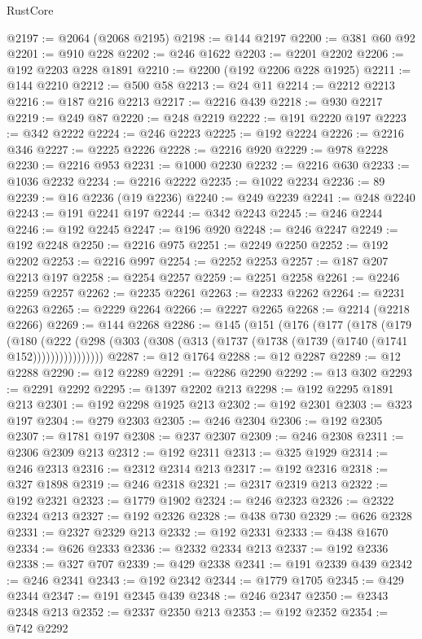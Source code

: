 \begin{lexlean}{RustCore}
\begin{coremodule}
@2197 := @2064 (@2068 @2195)
@2198 := @144 @2197
@2200 := @381 @60 @92
@2201 := @910 @228
@2202 := @246 @1622
@2203 := @2201 @2202
@2206 := @192 @2203 @228 @1891
@2210 := @2200 (@192 @2206 @228 @1925)
@2211 := @144 @2210
@2212 := @500 @58
@2213 := @24 @11
@2214 := @2212 @2213
@2216 := @187 @216 @2213
@2217 := @2216 @439
@2218 := @930 @2217
@2219 := @249 @87
@2220 := @248 @2219
@2222 := @191 @2220 @197
@2223 := @342 @2222
@2224 := @246 @2223
@2225 := @192 @2224
@2226 := @2216 @346
@2227 := @2225 @2226
@2228 := @2216 @920
@2229 := @978 @2228
@2230 := @2216 @953
@2231 := @1000 @2230
@2232 := @2216 @630
@2233 := @1036 @2232
@2234 := @2216 @2222
@2235 := @1022 @2234
@2236 := 89
@2239 := @16 @2236 (@19 @2236)
@2240 := @249 @2239
@2241 := @248 @2240
@2243 := @191 @2241 @197
@2244 := @342 @2243
@2245 := @246 @2244
@2246 := @192 @2245
@2247 := @196 @920
@2248 := @246 @2247
@2249 := @192 @2248
@2250 := @2216 @975
@2251 := @2249 @2250
@2252 := @192 @2202
@2253 := @2216 @997
@2254 := @2252 @2253
@2257 := @187 @207 @2213 @197
@2258 := @2254 @2257
@2259 := @2251 @2258
@2261 := @2246 @2259 @2257
@2262 := @2235 @2261
@2263 := @2233 @2262
@2264 := @2231 @2263
@2265 := @2229 @2264
@2266 := @2227 @2265
@2268 := @2214 (@2218 @2266)
@2269 := @144 @2268
@2286 := @145
    (@151
      (@176
        (@177
          (@178
            (@179
              (@180
                (@222
                  (@298 (@303 (@308 (@313 (@1737 (@1738 (@1739 (@1740 (@1741 @152))))))))))))))))
@2287 := @12 @1764
@2288 := @12 @2287
@2289 := @12 @2288
@2290 := @12 @2289
@2291 := @2286 @2290
@2292 := @13 @302
@2293 := @2291 @2292
@2295 := @1397 @2202 @213
@2298 := @192 @2295 @1891 @213
@2301 := @192 @2298 @1925 @213
@2302 := @192 @2301
@2303 := @323 @197
@2304 := @279 @2303
@2305 := @246 @2304
@2306 := @192 @2305
@2307 := @1781 @197
@2308 := @237 @2307
@2309 := @246 @2308
@2311 := @2306 @2309 @213
@2312 := @192 @2311
@2313 := @325 @1929
@2314 := @246 @2313
@2316 := @2312 @2314 @213
@2317 := @192 @2316
@2318 := @327 @1898
@2319 := @246 @2318
@2321 := @2317 @2319 @213
@2322 := @192 @2321
@2323 := @1779 @1902
@2324 := @246 @2323
@2326 := @2322 @2324 @213
@2327 := @192 @2326
@2328 := @438 @730
@2329 := @626 @2328
@2331 := @2327 @2329 @213
@2332 := @192 @2331
@2333 := @438 @1670
@2334 := @626 @2333
@2336 := @2332 @2334 @213
@2337 := @192 @2336
@2338 := @327 @707
@2339 := @429 @2338
@2341 := @191 @2339 @439
@2342 := @246 @2341
@2343 := @192 @2342
@2344 := @1779 @1705
@2345 := @429 @2344
@2347 := @191 @2345 @439
@2348 := @246 @2347
@2350 := @2343 @2348 @213
@2352 := @2337 @2350 @213
@2353 := @192 @2352
@2354 := @742 @2292

\end{coremodule}
\end{lexlean}
